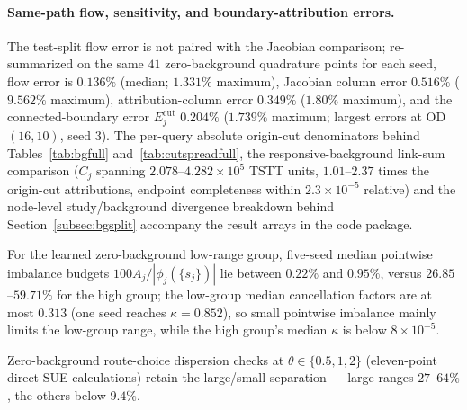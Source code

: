 \paragraph{Same-path flow, sensitivity, and boundary-attribution errors.}
The test-split flow error is not paired with the Jacobian comparison;
re-summarized on the same $41$ zero-background quadrature points for
each seed, flow error is $0.136\%$ (median; $1.331\%$ maximum),
Jacobian column error $0.516\%$ ($9.562\%$ maximum), attribution-column
error $0.349\%$ ($1.80\%$ maximum), and the connected-boundary error
$E_j^{\mathrm{cut}}$ $0.204\%$ ($1.739\%$ maximum; largest errors at
OD $(16,10)$, seed $3$). The per-query absolute origin-cut
denominators behind Tables~\ref{tab:bgfull}
and~\ref{tab:cutspreadfull}, the responsive-background
link-sum comparison ($C_j$ spanning $2.078$--$4.282\times10^5$ TSTT
units, $1.01$--$2.37$ times the origin-cut attributions, endpoint
completeness within $2.3\times10^{-5}$ relative) and the node-level
study/background divergence breakdown behind
Section~\ref{subsec:bgsplit} accompany the result arrays in the code
package.

For the learned zero-background low-range group, five-seed median pointwise
imbalance budgets $100A_j/|\phi_j(\{s_j\})|$ lie between $0.22\%$ and
$0.95\%$, versus $26.85$--$59.71\%$ for the high group; the low-group
median cancellation factors are at most $0.313$ (one seed reaches
$\kappa=0.852$), so small pointwise imbalance mainly limits the
low-group range, while the high group's median $\kappa$ is below
$8\times10^{-5}$.

Zero-background route-choice dispersion checks at $\theta\in\{0.5,1,2\}$
(eleven-point direct-SUE calculations) retain the large/small
separation --- large ranges $27$--$64\%$, the others below $9.4\%$.


